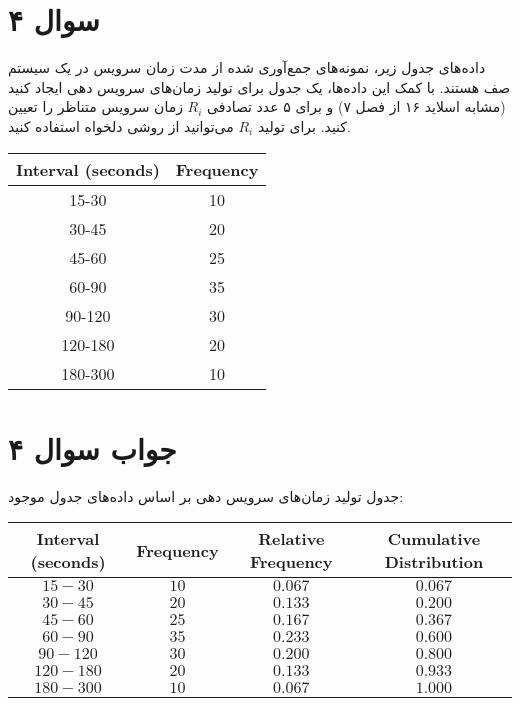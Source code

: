 \section*{سوال ۴}
	
داده‌های جدول زیر، نمونه‌های جمع‌آوری شده از مدت زمان سرویس در یک سیستم صف هستند. با کمک این داده‌ها، یک جدول برای تولید زمان‌های سرویس دهی ایجاد کنید (مشابه اسلاید ۱۶ از فصل ۷) و برای ۵ عدد تصادفی \( R_i \) زمان سرویس متناظر را تعیین کنید. برای تولید \( R_i \) می‌توانید از روشی دلخواه استفاده کنید.

\begin{center}
	\begin{tabular}{ |c|c| }
		\hline
		Interval (seconds) & Frequency \\
		\hline
		15-30 & 10 \\
		30-45 & 20 \\
		45-60 & 25 \\
		60-90 & 35 \\
		90-120 & 30 \\
		120-180 & 20 \\
		180-300 & 10 \\
		\hline
	\end{tabular}
\end{center}

\section*{جواب سوال ۴}

جدول تولید زمان‌های سرویس دهی بر اساس داده‌های جدول موجود:

\begin{center}
	\begin{tabular}{ |c|c|c|c| }
		\hline
		Interval (seconds) & Frequency & Relative Frequency & Cumulative Distribution \\
		\hline
		$15-30$ & $10$ & $0.067$ & $0.067$ \\
		$30-45$ & $20$ & $0.133$ & $0.200$ \\
		$45-60$ & $25$ & $0.167$ & $0.367$ \\
		$60-90$ & $35$ & $0.233$ & $0.600$ \\
		$90-120$ & $30$ & $0.200$ & $0.800$ \\
		$120-180$ & $20$ & $0.133$ & $0.933$ \\
		$180-300$ & $10$ & $0.067$ & $1.000$ \\
		\hline
	\end{tabular}
\end{center}

